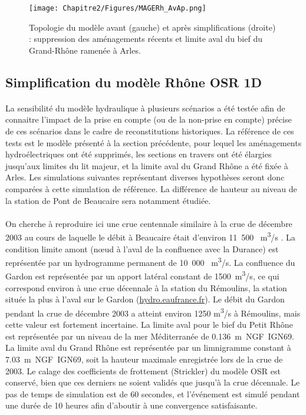 	\begin{figure}[h]
	\centering
		\texttt{[image: Chapitre2/Figures/MAGERh\_AvAp.png]}
        \caption{Topologie du modèle avant (gauche) et après simplifications (droite) : suppression des aménagements récents et limite aval du bief du Grand-Rhône ramenée à Arles.}
		\label{fig:Mageavap}
	\end{figure}		
	
\FloatBarrier	
	\subsection{Simplification du modèle Rhône OSR 1D}
		
	\paragraph{} La sensibilité du modèle hydraulique à plusieurs scénarios a été testée afin de connaitre l'impact de la prise en compte (ou de la non-prise en compte) précise de ces scénarios dans le cadre de reconstitutions historiques. La référence de ces tests est le modèle présenté à la section précédente, pour lequel les aménagements hydroélectriques ont été supprimés, les sections en travers ont été élargies jusqu'aux limites du lit majeur, et la limite aval du Grand Rhône a été fixée à Arles. Les simulations suivantes représentant diverses hypothèses seront donc comparées à cette simulation de référence. La différence de hauteur au niveau de la station de Pont de Beaucaire sera notamment étudiée.
	
	\paragraph{} On cherche à reproduire ici une crue centennale similaire à la crue de décembre 2003 au cours de laquelle le débit à Beaucaire était d'environ 11~500~ m\textsuperscript{3}/s \citep{medd_debit_2005}. La condition limite amont (nœud à l'aval de la confluence avec la Durance) est représentée par un hydrogramme permanent de 10~000~ m\textsuperscript{3}/s. La confluence du Gardon est représentée par un apport latéral constant de 1500~m\textsuperscript{3}/s, ce qui correspond environ à une crue décennale à la station du Rémoulins, la station située la plus à l'aval sur le Gardon (\url{hydro.eaufrance.fr}). Le débit du Gardon pendant la crue de décembre 2003 a atteint environ 1250 m\textsuperscript{3}/s à Rémoulins, mais cette valeur est fortement incertaine. La limite aval pour le bief du Petit Rhône est représentée par un niveau de la mer Méditerranée de 0.136~m~NGF~IGN69. La limite aval du Grand Rhône est représentée par un limnigramme constant à 7.03~m~NGF~IGN69, soit la hauteur maximale enregistrée lors de la crue de 2003. Le calage des coefficients de frottement (Strickler) du modèle OSR \citep{launay_zabr-osr_2017} est conservé, bien que ces derniers ne soient validés que jusqu'à la crue décennale. Le pas de temps de simulation est de 60 secondes, et l'événement est simulé pendant une durée de 10 heures afin d'aboutir à une convergence satisfaisante.

